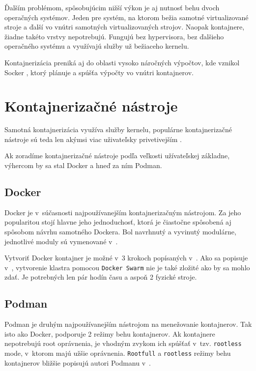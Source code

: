 \documentclass[11pt, a4paper]{article}
\begin{document}
    Ďalším problémom, spôsobujúcim nižší výkon je aj nutnosť behu dvoch operačných systémov. Jeden pre systém, na ktorom bežia samotné virtualizované stroje a ďalší vo vnútri samotných virtualizovaných strojov.
    Naopak kontajnere, žiadne takéto vrstvy nepotrebujú. Fungujú bez hypervisora, bez ďalšieho operačného systému a využívajú služby už bežiaceho kernelu.
    
    Kontajnerizácia preniká aj do oblasti vysoko náročných výpočtov, kde vznikol Socker \cite{Azab:2017:HPCContainers}, ktorý plánuje a spúšťa výpočty vo vnútri kontajnerov.
   
\section{Kontajnerizačné nástroje}
    Samotná kontajnerizácia využíva služby kernelu, populárne kontajnerizačné
    nástroje sú teda len akýmsi viac uživateľsky privetivejším .
    
    Ak zoradíme kontajnerizačné nástroje podľa veľkosti užívateľskej základne, výhercom by sa stal Docker a hneď za ním Podman.
    \subsection{Docker}
        Docker je v~súčasnosti najpoužívanejším kontajnerizačným nástrojom. Za jeho popularitou stojí hlavne jeho jednoduchosť, ktorá je čiastočne spôsobená aj spôsobom návrhu samotného Dockera. Bol navrhnutý a vyvinutý modulárne, jednotlivé moduly sú vymenované v~\cite{Alonso:2017:Containerization}.
        
        Vytvoriť Docker kontajner je možné v~3 krokoch popísaných v~\cite{Nigel:2018:DDD}. Ako sa popisuje v~\cite{Ellis:2016:DockerSwarm}, vytvorenie klastra pomocou \texttt{Docker Swarm} nie je také zložité ako by sa mohlo zdať. Je potrebných len pár hodín času a aspoň 2 fyzické stroje.
    \subsection{Podman}
        Podman je druhým najpoužívanejším nástrojom na menežovanie kontajnerov. Tak isto ako Docker, podporuje 2 režimy behu kontajnerov. Ak kontajnere nepotrebujú root oprávnenia, je vhodným zvykom ich spúšťať v~tzv. \texttt{rootless} mode, v~ktorom majú užšie oprávnenia. \texttt{Rootfull} a \texttt{rootless} režimy behu kontajnerov bližšie popisujú autori Podmanu v~\cite{RH:2019:LessVsFull}.
\end{document}
